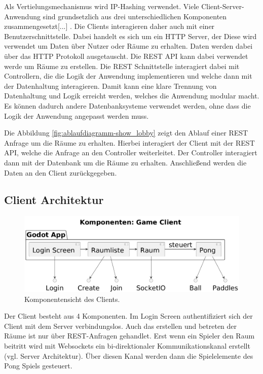\documentclass[
]{article}
\begin{document}
Als Vertielungsmechanismus wird IP-Hashing verwendet.
\glqq Viele Client-Server-Anwendung sind grundsetzlich aus drei unterschiedlichen Komponenten zusammengesetzt[...]\grqq{} \cite[S.57 ff.]{tanenbaum2007distributed}.
Die Clients interagieren daher auch mit einer Benutzerschnittstelle. Dabei handelt es sich um ein HTTP Server, der
Diese wird verwendet um Daten über Nutzer oder Räume zu erhalten.
Daten werden dabei über das HTTP Protokoll ausgetauscht. 
Die REST API kann dabei verwendet werde um Räume zu erstellen.
Die REST Schnittstelle interagiert dabei mit Controllern, die die Logik der Anwendung implementieren und welche dann
mit der Datenhaltung interagieren. Damit kann eine klare Trennung von Datenhaltung und Logik erreicht werden, welches die Anwendung
modular macht. Es können dadurch andere Datenbanksysteme verwendet werden, ohne dass die Logik der Anwendung angepasst werden muss.

Die Abbildung \ref{fig:ablaufdiagramm-show_lobby} zeigt den Ablauf einer REST Anfrage um die Räume zu erhalten.
Hierbei interagiert der Client mit der REST API, welche die Anfrage an den Controller weiterleitet.
Der Controller interagiert dann mit der Datenbank um die Räume zu erhalten. Anschließend werden die Daten an den Client zurückgegeben.

\subsection{Client Architektur}
\begin{figure}[H]
	\centering
	\includegraphics[width=\textwidth ]{resources/Client-Architektur.png}
	\caption{Komponentensicht des Clients.}
	\label{fig:clientarchitektur}
\end{figure}
Der Client besteht aus 4 Komponenten. Im Login Screen authentifiziert sich der Client mit dem Server verbindungslos. Auch das erstellen und betreten der Räume ist nur über REST-Anfragen gehandlet. Erst wenn ein Spieler den Raum beitritt wird mit Websockets ein bi-direktionaler Kommunikationskanal erstellt (vgl. Server Architektur). Über diesen Kanal werden dann die Spielelemente des Pong Spiels gesteuert. 
\end{document}
